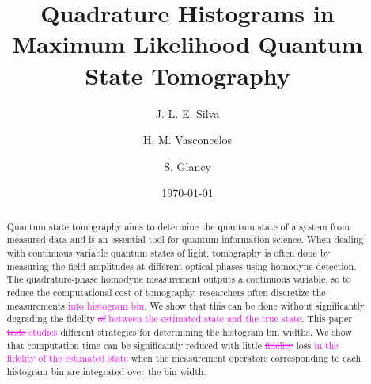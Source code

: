 \documentclass[
reprint,
superscriptaddress,
showpacs,
amsmath,
amssymb,
aps,
pra,
longbibliography
]{revtex4-1}
\providecommand{\aucmnt}[1]{#1}
\providecommand{\editcolor}[2]{\textcolor{#1}{#2}}
\providecommand{\aucmnt}[1]{}
\providecommand{\editcolor}[2]{#2}
\newcommand{\SG}[1]{\editcolor{magenta}{#1}}
\newcommand{\SGs}[1]{\aucmnt{\editcolor{magenta}{\sout{#1}}}}
\begin{document}

\title{Quadrature Histograms in Maximum Likelihood Quantum State Tomography}%
\author{J. L. E. Silva}
\author{H. M. Vasconcelos}
\author{S. Glancy}


\date{\today}%

\begin{abstract}
  Quantum state tomography aims to determine the quantum state of a
  system from measured data and is an essential tool for quantum
  information science.  When dealing with continuous variable quantum
  states of light, tomography is often done by measuring the field
  amplitudes at different optical phases using homodyne detection.
  The quadrature-phase homodyne measurement outputs a continuous
  variable, so to reduce the computational cost of tomography,
  researchers often discretize the measurements\SGs{ into histogram
    bin}.  We show that this can be done without significantly
  degrading the fidelity \SGs{of} \SG{between the estimated state and
    the true state}.  This paper \SGs{tests} \SG{studies} different
  strategies for determining the histogram bin widths. We show that
  computation time can be significantly reduced with little
  \SGs{fidelity} loss \SG{in the fidelity of the estimated state} when
  the measurement operators corresponding to each histogram bin are
  integrated over the bin width.
\end{abstract}

\maketitle
\end{document}
